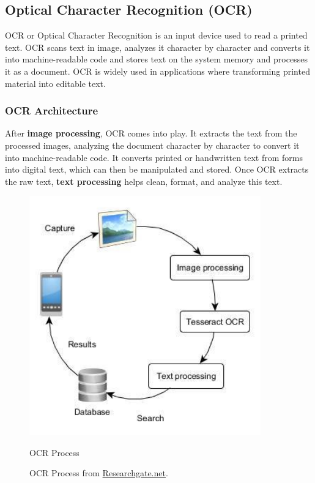 \documentclass[12pt,oneside,openright,a4paper]{cpe-english-project}
\begin{document}
\subsection{Optical Character Recognition (OCR)} OCR or Optical Character Recognition is an input device used to read a printed text. OCR scans text in image, analyzes it character by character and converts it into machine-readable code and stores text on the system memory and processes it as a document. OCR is widely used in applications where transforming printed material into editable text.

\subsubsection{OCR Architecture} After \textbf{image processing}, OCR comes into play. It extracts the text from the processed images, analyzing the document character by character to convert it into machine-readable code. It converts printed or handwritten text from forms into digital text, which can then be manipulated and stored. Once OCR extracts the raw text, \textbf{text processing} helps clean, format, and analyze this text.

\begin{figure}[H]
\centering
\includegraphics[width=10cm]{./assets/OCR-Process.png}
\caption{OCR Process}
\caption{OCR Process from 
\href{https://www.researchgate.net/profile/Adrian-Gomez-9/publication/281099638/figure/fig4/AS:614266293997575@1523463905255/Architecture-diagram-for-the-OCR-alternative.png}{Researchgate.net}.}
\label{fig:figure-2.2}
\end{figure}
\end{document}
